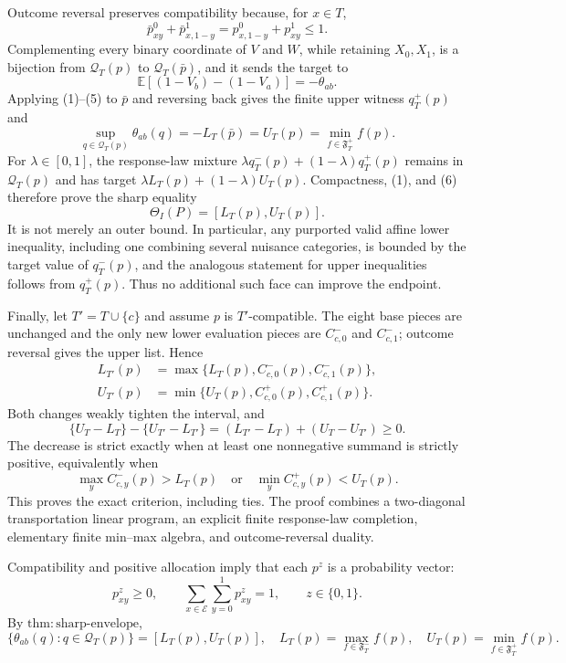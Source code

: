 Outcome reversal preserves compatibility because, for \(x\in T\),
\[
 \bar p^0_{xy}+\bar p^1_{x,1-y}
 =p^0_{x,1-y}+p^1_{xy}\le1.
\]
Complementing every binary coordinate of \(V\) and \(W\), while retaining
\(X_0,X_1\), is a bijection from \(\mathcal Q_T(p)\) to
\(\mathcal Q_T(\bar p)\), and it sends the target to
\[
 \mathbb E[(1-V_b)-(1-V_a)]=-\theta_{ab}.
\]
Applying (1)--(5) to \(\bar p\) and reversing back gives the finite upper
witness \(q^+_T(p)\) and
\[
 \sup_{q\in\mathcal Q_T(p)}\theta_{ab}(q)
 =-L_T(\bar p)=U_T(p)
 =\min_{f\in\mathfrak F^+_T}f(p). \tag{6}
\]
For \(\lambda\in[0,1]\), the response-law mixture
\(\lambda q^-_T(p)+(1-\lambda)q^+_T(p)\) remains in
\(\mathcal Q_T(p)\) and has target
\(\lambda L_T(p)+(1-\lambda)U_T(p)\).  Compactness, (1), and (6) therefore
prove the sharp equality
\[
 \Theta_I(P)=[L_T(p),U_T(p)].
\]
It is not merely an outer bound.  In particular, any purported valid affine
lower inequality, including one combining several nuisance categories, is
bounded by the target value of \(q^-_T(p)\), and the analogous statement for
upper inequalities follows from \(q^+_T(p)\).  Thus no additional such face
can improve the endpoint.

Finally, let \(T'=T\cup\{c\}\) and assume \(p\) is \(T'\)-compatible.  The
eight base pieces are unchanged and the only new lower evaluation pieces
are \(C^-_{c,0}\) and \(C^-_{c,1}\); outcome reversal gives the upper list.
Hence
\[
\begin{aligned}
 L_{T'}(p)&=\max\{L_T(p),C^-_{c,0}(p),C^-_{c,1}(p)\},\\
 U_{T'}(p)&=\min\{U_T(p),C^+_{c,0}(p),C^+_{c,1}(p)\}.
\end{aligned}
\]
Both changes weakly tighten the interval, and
\[
 \{U_T-L_T\}-\{U_{T'}-L_{T'}\}
 =(L_{T'}-L_T)+(U_T-U_{T'})\ge0.
\]
The decrease is strict exactly when at least one nonnegative summand is
strictly positive, equivalently when
\[
 \max_y C^-_{c,y}(p)>L_T(p)
 \quad\text{or}\quad
 \min_y C^+_{c,y}(p)<U_T(p).
\]
This proves the exact criterion, including ties.  The proof combines a
two-diagonal transportation linear program, an explicit finite response-law
completion, elementary finite min--max algebra, and outcome-reversal
duality.

Compatibility and positive allocation imply that each \(p^z\) is a
probability vector:
\[
 p^z_{xy}\ge0,
 \qquad
 \sum_{x\in\mathcal E}\sum_{y=0}^1p^z_{xy}=1,
 \qquad z\in\{0,1\}. \tag{1}
\]
By \(\mathrm{thm{:}sharp\mbox{-}envelope}\),
\[
 \{\theta_{ab}(q):q\in\mathcal Q_T(p)\}=[L_T(p),U_T(p)],
 \quad
 L_T(p)=\max_{f\in\mathfrak F^-_T}f(p),
 \quad
 U_T(p)=\min_{f\in\mathfrak F^+_T}f(p). \tag{2}
\]

